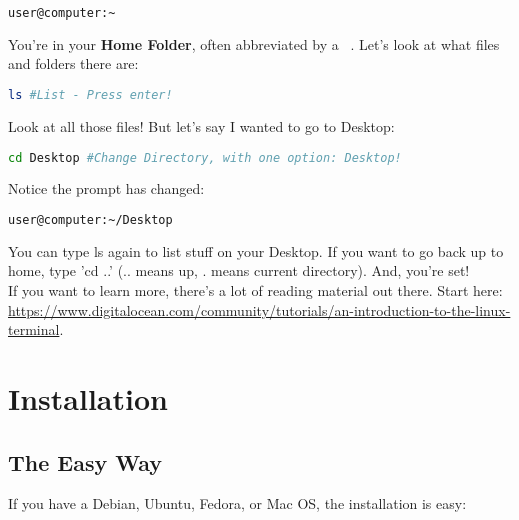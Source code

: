\documentclass[a4paper,12pt]{article}
\begin{document}
\begin{lstlisting}[language=bash]
	user@computer:~
\end{lstlisting}

		You're in your \textbf{Home Folder}, often abbreviated by a ~. Let's look at what files and folders there are:
	
\begin{lstlisting}[language=bash]
	ls #List - Press enter!
\end{lstlisting}

		Look at all those files! But let's say I wanted to go to Desktop:
		
\begin{lstlisting}[language=bash]
	cd Desktop #Change Directory, with one option: Desktop!
\end{lstlisting}

		Notice the prompt has changed:
	
\begin{lstlisting}[language=bash]
	user@computer:~/Desktop
\end{lstlisting}
		
		You can type ls again to list stuff on your Desktop. If you want to go back up to home, type 'cd ..' (.. means up, . means current directory). And, you're set!\\
		
		If you want to learn more, there's a lot of reading material out there. Start here: \url{https://www.digitalocean.com/community/tutorials/an-introduction-to-the-linux-terminal}.

\section{Installation}
	\subsection{The Easy Way}
	
		If you have a Debian, Ubuntu, Fedora, or Mac OS, the installation is easy:
\end{document}
